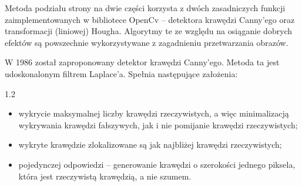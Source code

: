\documentclass[a4paper,12pt]{article}
\newcommand\spacingInSolemnItemize{1.2}
\begin{document}
		        Metoda podziału strony na dwie części korzysta z dwóch zasadniczych funkcji zaimplementowanych w bibliotece OpenCv -- detektora krawędzi Canny'ego oraz transformacji (liniowej) Hougha. Algorytmy te ze względu na osiąganie dobrych efektów są powszechnie wykorzystywane z zagadnieniu przetwarzania obrazów.
		
		
		        W 1986 został zaproponowany detektor krawędzi Canny'ego. Metoda ta jest udoskonalonym filtrem Laplace'a. Spełnia następujące założenia: 
		        \begin{spacing}{\spacingInSolemnItemize}
    		        \begin{itemize}
    		            \item wykrycie maksymalnej liczby krawędzi rzeczywistych, a więc minimalizacją wykrywania krawędzi fałszywych, jak i nie pomijanie krawędzi rzeczywistych;
    		            \item wykryte krawędzie  zlokalizowane są jak najbliżej krawędzi rzeczywistych;
    		            \item pojedynczej odpowiedzi -- generowanie krawędzi o szerokości jednego piksela, która jest rzeczywistą krawędzią, a nie szumem.
    		        \end{itemize}
		        \end{spacing}
		        
\end{document}
